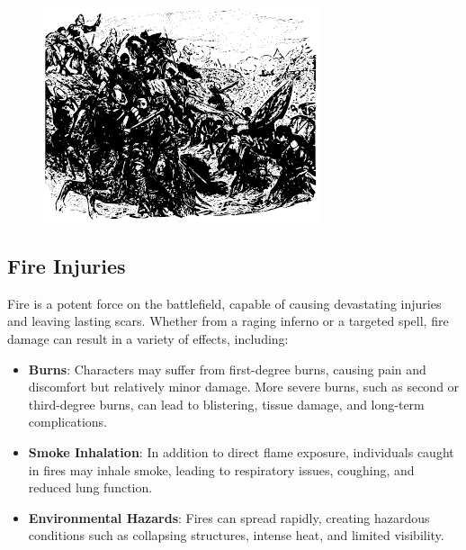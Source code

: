 \documentclass[12pt]{book}  %
\begin{document}
\begin{figure}[h]
    \centering
    \includegraphics[width=\textwidth]{./images/combat16.pdf}
\end{figure}

\subsection{Fire Injuries}

Fire is a potent force on the battlefield, capable of causing devastating injuries and leaving lasting scars. Whether from a raging inferno or a targeted spell, fire damage can result in a variety of effects, including:

\begin{itemize}
    \item \textbf{Burns}: Characters may suffer from first-degree burns, causing pain and discomfort but relatively minor damage. More severe burns, such as second or third-degree burns, can lead to blistering, tissue damage, and long-term complications.
    \item \textbf{Smoke Inhalation}: In addition to direct flame exposure, individuals caught in fires may inhale smoke, leading to respiratory issues, coughing, and reduced lung function.
    \item \textbf{Environmental Hazards}: Fires can spread rapidly, creating hazardous conditions such as collapsing structures, intense heat, and limited visibility.
\end{itemize}
\end{document}
